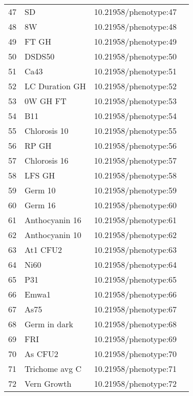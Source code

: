 \begin{longtable}{p{} p{} p{} p{}}
 47 & SD & 10.21958/phenotype:47 & \cite{atwell2010}\\
 48 & 8W & 10.21958/phenotype:48 & \cite{atwell2010}\\
 49 & FT GH & 10.21958/phenotype:49 & \cite{atwell2010}\\
 50 & DSDS50 & 10.21958/phenotype:50 & \cite{atwell2010}\\
 51 & Ca43 & 10.21958/phenotype:51 & \cite{atwell2010}\\
 52 & LC Duration GH & 10.21958/phenotype:52 & \cite{atwell2010}\\
 53 & 0W GH FT & 10.21958/phenotype:53 & \cite{atwell2010}\\
 54 & B11 & 10.21958/phenotype:54 & \cite{atwell2010}\\
 55 & Chlorosis 10 & 10.21958/phenotype:55 & \cite{atwell2010}\\
 56 & RP GH & 10.21958/phenotype:56 & \cite{atwell2010}\\
 57 & Chlorosis 16 & 10.21958/phenotype:57 & \cite{atwell2010}\\
 58 & LFS GH & 10.21958/phenotype:58 & \cite{atwell2010}\\
 59 & Germ 10 & 10.21958/phenotype:59 & \cite{atwell2010}\\
 60 & Germ 16 & 10.21958/phenotype:60 & \cite{atwell2010}\\
 61 & Anthocyanin 16 & 10.21958/phenotype:61 & \cite{atwell2010}\\
 62 & Anthocyanin 10 & 10.21958/phenotype:62 & \cite{atwell2010}\\
 63 & At1 CFU2 & 10.21958/phenotype:63 & \cite{atwell2010}\\
 64 & Ni60 & 10.21958/phenotype:64 & \cite{atwell2010}\\
 65 & P31 & 10.21958/phenotype:65 & \cite{atwell2010}\\
 66 & Emwa1 & 10.21958/phenotype:66 & \cite{atwell2010}\\
 67 & As75 & 10.21958/phenotype:67 & \cite{atwell2010}\\
 68 & Germ in dark & 10.21958/phenotype:68 & \cite{atwell2010}\\
 69 & FRI & 10.21958/phenotype:69 & \cite{atwell2010}\\
 70 & As CFU2 & 10.21958/phenotype:70 & \cite{atwell2010}\\
 71 & Trichome avg C & 10.21958/phenotype:71 & \cite{atwell2010}\\
 72 & Vern Growth & 10.21958/phenotype:72 & \cite{atwell2010}\\

\end{longtable}
